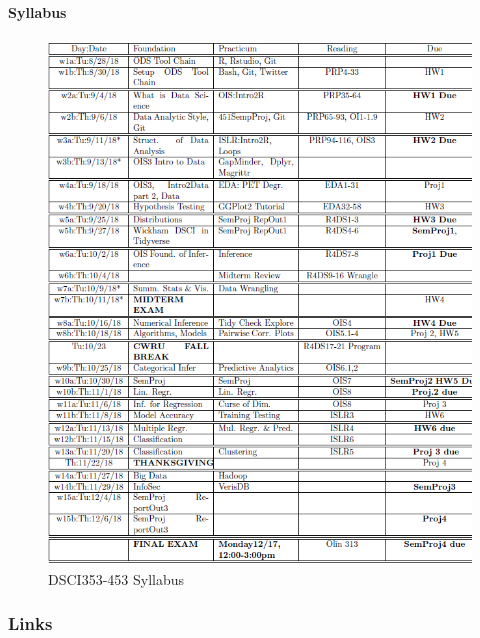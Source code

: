 \documentclass[]{article}
\let\oldparagraph\paragraph
\renewcommand{\paragraph}[1]{\oldparagraph{#1}\mbox{}}
\begin{document}
\hypertarget{syllabus}{%
\paragraph{Syllabus}\label{syllabus}}

\begin{figure}
\centering
\includegraphics{./figs/syllabus.png}
\caption{DSCI353-453 Syllabus}
\end{figure}

\hypertarget{links}{%
\subsubsection{Links}\label{links}}
\end{document}
